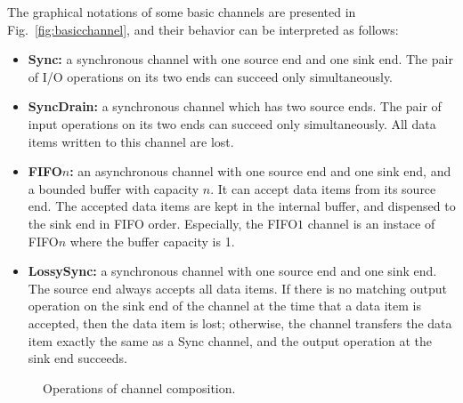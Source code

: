 \documentclass[preprint,3p]{elsarticle}
\begin{document}
The graphical notations of some basic channels are presented in Fig.~\ref{fig:basicchannel}, and their behavior can be interpreted as follows:
\begin{itemize}
\item{\textbf{Sync:} a synchronous channel with one source end and one sink end. The pair of I/O operations on its two ends can succeed only simultaneously.}
\item{\textbf{SyncDrain:} a synchronous channel which has two source ends.
 The pair of input operations on its two ends can succeed only simultaneously.
 All data items written to this channel are lost.}
\item{\textbf{FIFO$n$:} an asynchronous channel with one source end and one sink end, and a bounded buffer with capacity $n$.
It can accept data items from its source end. The accepted data items are kept in the internal buffer, and dispensed to
the sink end in FIFO order.
Especially, the FIFO$1$ channel is an instace of FIFO$n$ where the buffer capacity is 1.}
\item{\textbf{LossySync:} a synchronous channel with one source end
    and one sink end. The source end always accepts all data items. If
    there is no matching output operation on the sink end of the
    channel at the time that a data item is accepted, then the data
    item is lost; otherwise, the channel transfers the data item
    exactly the same as a Sync channel, and the output operation at the sink end succeeds.}
\end{itemize}

\begin{figure}[ht]
\centering
{}
\caption{Operations of channel composition.}\label{fig:channelcomposition}
\end{figure}
\end{document}
